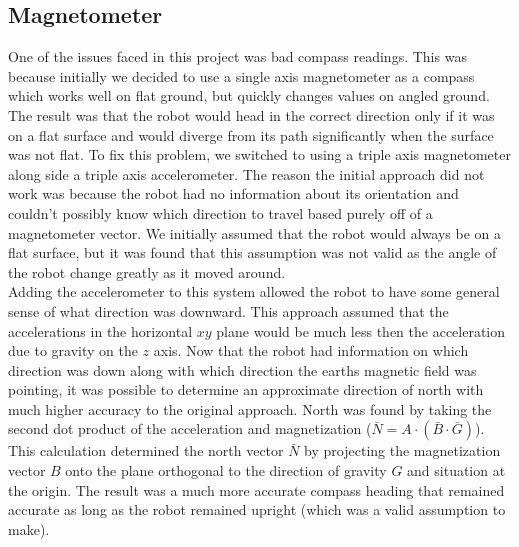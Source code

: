 \documentclass[final,letterpaper,singleside,12pt]{article}
\begin{document}
\subsection{Magnetometer} %
\label{sub:magnetometer}
One of the issues faced in this project was bad compass readings. This was because initially we decided to use a single axis magnetometer as a compass which works well on flat ground, but quickly changes values on angled ground. The result was that the robot would head in the correct direction only if it was on a flat surface and would diverge from its path significantly when the surface was not flat. To fix this problem, we switched to using a triple axis magnetometer along side a triple axis accelerometer. The reason the initial approach did not work was because the robot had no information about its orientation and couldn't possibly know which direction to travel based purely off of a magnetometer vector. We initially assumed that the robot would always be on a flat surface, but it was found that this assumption was not valid as the angle of the robot change greatly as it moved around.\\
Adding the accelerometer to this system allowed the robot to have some general sense of what direction was downward. This approach assumed that the accelerations in the horizontal $xy$ plane would be much less then the acceleration due to gravity on the $z$ axis. Now that the robot had information on which direction was down along with which direction the earths magnetic field was pointing, it was possible to determine an approximate direction of north with much higher accuracy to the original approach. North was found by taking the second dot product of the acceleration and magnetization ($\bar N=A \cdot \left(\bar B \cdot \bar G\right)$). This calculation determined the north vector $\bar N$ by projecting the magnetization vector $B$ onto the plane orthogonal to the direction of gravity $G$ and situation at the origin. The result was a much more accurate compass heading that remained accurate as long as the robot remained upright (which was a valid assumption to make).
\end{document}

